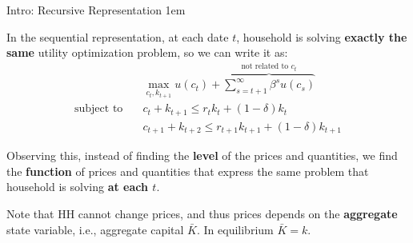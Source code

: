 \documentclass[11pt,aspectratio=43,usenames,dvipsnames]{beamer}
\let\olditemize=\itemize
\let\endolditemize=\enditemize
\renewenvironment{itemize}{\olditemize \itemsep1em}{\endolditemize}
\theoremstyle{definition}
\begin{document}
\begin{frame}{Intro: Recursive Representation}
\label{slide:Intro__Recursive_Representation}
\small
    \begin{itemize}
        \item In the sequential representation, at each date $ t $, household is solving \textbf{exactly the same} utility optimization problem, so we can write it as:
        \begin{align}
                & \max_{c_{t}, k_{t+1}} u(c_{t}) + \overbrace{\sum_{s = t+1}^{\infty} \beta^{s} u(c_{s})}^{\text{not related to } c_{t}}
            \\
            \text{subject to} \quad
                & c_{t} + k_{t+1} \le r_{t} k_{t} + (1-\delta) k_{t}
            \\
                & c_{t+1} + k_{t+2} \le r_{t+1} k_{t+1} + (1-\delta)k_{t+1}
        \end{align}
        \item Observing this, instead of finding the \textbf{level} of the prices and quantities, we find the \textbf{function} of prices and quantities that express the same problem that household is solving \textbf{at each $t$}.
        \item Note that HH cannot change prices, and thus prices depends on the \textbf{aggregate} state variable, i.e., aggregate capital $ \bar{K} $. In equilibrium $ \bar{K} = k $.
    \end{itemize}

\end{frame}
\end{document}
